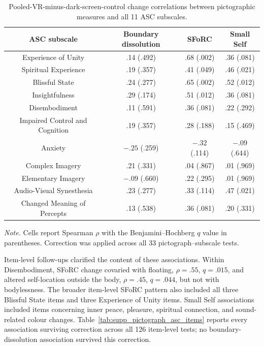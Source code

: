 \documentclass[pdflatex,sn-basic,lineno]{../sn-jnl}
\begin{document}
\begin{table}[!htbp]
\centering
\footnotesize
\setlength{\tabcolsep}{2.5pt}
\caption{Pooled-VR-minus-dark-screen-control change correlations between pictographic measures and all 11 ASC subscales.}
\label{tab:supp_pictograph_asc_subscales}
\begin{tabular*}{\textwidth}{@{\extracolsep{\fill}}cccc@{}}
\toprule
ASC subscale & Boundary dissolution & SFoRC & Small Self \\
\midrule
Experience of Unity & .14 (.492) & .68 (.002) & .36 (.081) \\
Spiritual Experience & .19 (.357) & .41 (.049) & .46 (.021) \\
Blissful State & .24 (.277) & .65 (.002) & .52 (.012) \\
Insightfulness & .29 (.174) & .51 (.012) & .36 (.081) \\
Disembodiment & .11 (.591) & .36 (.081) & .22 (.292) \\
Impaired Control and Cognition & .19 (.357) & .28 (.188) & .15 (.469) \\
Anxiety & $-.25$ (.259) & $-.32$ (.114) & $-.09$ (.644) \\
Complex Imagery & .21 (.331) & .04 (.867) & .01 (.969) \\
Elementary Imagery & $-.09$ (.660) & .22 (.295) & .01 (.969) \\
Audio-Visual Synesthesia & .23 (.277) & .33 (.114) & .47 (.021) \\
Changed Meaning of Percepts & .13 (.538) & .36 (.081) & .20 (.331) \\
\bottomrule
\end{tabular*}
\par\smallskip
\parbox{\textwidth}{\footnotesize\textit{Note.} Cells report Spearman $\rho$ with the Benjamini--Hochberg $q$ value in parentheses. Correction was applied across all 33 pictograph--subscale tests.}
\end{table}
\FloatBarrier

Item-level follow-ups clarified the content of these associations. Within Disembodiment, SFoRC change covaried with floating, $\rho=.55$, $q=.015$, and altered self-location outside the body, $\rho=.45$, $q=.044$, but not with bodylessness. The broader item-level SFoRC pattern also included all three Blissful State items and three Experience of Unity items. Small Self associations included items concerning inner peace, pleasure, spiritual connection, and sound-related colour changes. Table~\ref{tab:supp_pictograph_asc_items} reports every association surviving correction across all 126 item-level tests; no boundary-dissolution association survived this correction.
\end{document}
